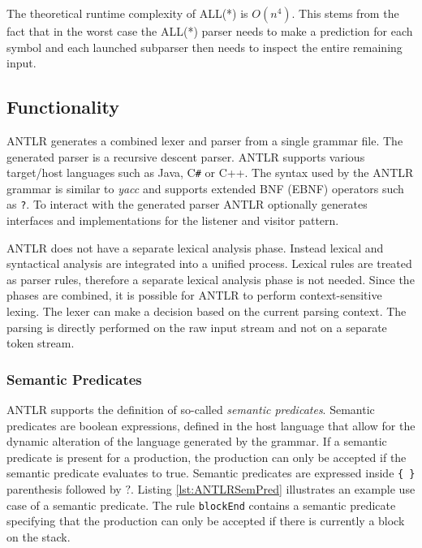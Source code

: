 The theoretical runtime complexity of ALL(*) is $O(n^4)$. This stems from the fact that in the worst case the ALL(*) parser needs to make a prediction for each symbol and each launched subparser then needs to inspect the entire remaining input. 


\subsection{Functionality}

ANTLR generates a combined lexer and parser from a single grammar file. The generated parser is a recursive descent parser. ANTLR supports various target/host languages such as Java, C\verb|#| or C++. The syntax used by the ANTLR grammar is similar to \textit{yacc} and supports extended BNF (EBNF) operators such as \texttt{?}. To interact with the generated parser ANTLR optionally generates interfaces and implementations for the listener and visitor pattern.

ANTLR does not have a separate lexical analysis phase. Instead lexical and syntactical analysis are integrated into a unified process. Lexical rules are treated as parser rules, therefore a separate lexical analysis phase is not needed. Since the phases are combined, it is possible for ANTLR to perform context-sensitive lexing. The lexer can make a decision based on the current parsing context. The parsing is directly performed on the raw input stream and not on a separate token stream. 

\subsubsection{Semantic Predicates}

ANTLR supports the definition of so-called \textit{semantic predicates}. Semantic predicates are boolean expressions, defined in the host language that allow for the dynamic alteration of the language generated by the grammar. If a semantic predicate is present for a production, the production can only be accepted if the semantic predicate evaluates to true. Semantic predicates are expressed inside \verb|{ }| parenthesis followed by $?$. Listing \ref{lst:ANTLRSemPred} illustrates an example use case of a semantic predicate. The rule \texttt{blockEnd} contains a semantic predicate specifying that the production can only be accepted if there is currently a block on the stack. 

